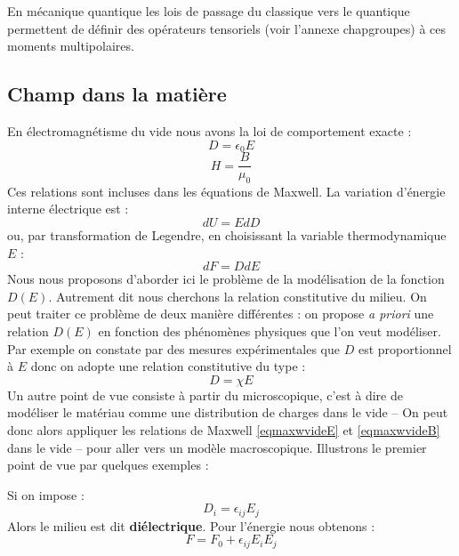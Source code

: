 \documentclass[12pt]{book}
\begin{document}
\begin{rem} En
m\'ecanique quantique les lois de passage du classique vers le quantique
permettent de d\'efinir des op\'erateurs tensoriels (voir l'annexe
{chapgroupes}) \`a ces moments multipolaires. 
\end{rem}
\subsection{Champ dans la mati\`ere}\label{secchampdslamat}
En \'electromagn\'etisme du vide nous avons la loi de comportement
exacte :
\begin{equation}\label{eqmaxwvideE}
D=\epsilon_0E
\end{equation}
\begin{equation}\label{eqmaxwvideB}
H=\frac{B}{\mu_0}
\end{equation}
Ces relations sont incluses dans les \'equations de Maxwell.
La variation d'\'energie interne \'electrique est :
\begin{equation}
dU=EdD
\end{equation}
ou, par transformation de Legendre, en choisissant la variable
thermodynamique $E$ :
\begin{equation}
dF=DdE
\end{equation}
Nous nous proposons d'aborder ici le probl\`eme de la mod\'elisation
de la fonction $D(E)$. Autrement dit nous cherchons la relation
constitutive du milieu. On peut traiter ce probl\`eme de deux
mani\`ere diff\'erentes : on propose {\it a priori} une relation $D(E)$ en
fonction des ph\'enom\`enes physiques que l'on veut mod\'eliser. Par
exemple on constate par des mesures exp\'erimentales que $D$ est
proportionnel \`a $E$ donc on adopte une relation constitutive du type :
\begin{equation}
D=\chi E
\end{equation}
Un autre point de vue consiste \`a partir du microscopique, c'est \`a
dire de mod\'eliser le mat\'eriau comme une distribution de charges
dans le vide -- On peut donc
alors appliquer les relations de Maxwell 
\ref{eqmaxwvideE} et \ref{eqmaxwvideB} dans le vide -- pour aller vers
un mod\`ele macroscopique. 
Illustrons le premier point de vue par quelques exemples :
\begin{exmp}
Si on impose :
\begin{equation}
D_i=\epsilon_{ij}E_j
\end{equation}
Alors le milieu est dit {\bf di\'electrique}.
Pour l'\'energie nous obtenons :
\begin{equation}
F=F_0+\epsilon_{ij}E_iE_j
\end{equation}
\end{exmp}
\end{document}
